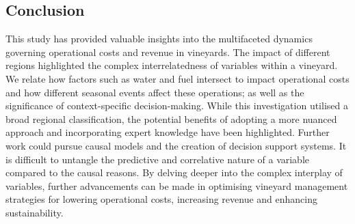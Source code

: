 \documentclass[review,12pt,authoryear]{elsarticle}
\begin{document}
\begin{linenumbers}
\fi

\section{Conclusion}

This study has provided valuable insights into the multifaceted dynamics governing operational costs and revenue in vineyards. The impact of different regions highlighted the complex interrelatedness of variables within a vineyard. We relate how factors such as water and fuel intersect to impact operational costs and how different seasonal events affect these operations; as well as the significance of context-specific decision-making. While this investigation utilised a broad regional classification, the potential benefits of adopting a more nuanced approach and incorporating expert knowledge have been highlighted. Further work could pursue causal models and the creation of decision support systems. It is difficult to untangle the predictive and correlative nature of a variable compared to the causal reasons. By delving deeper into the complex interplay of variables, further advancements can be made in optimising vineyard management strategies for lowering operational costs, increasing revenue and enhancing sustainability.






\end{linenumbers}
\end{document}
